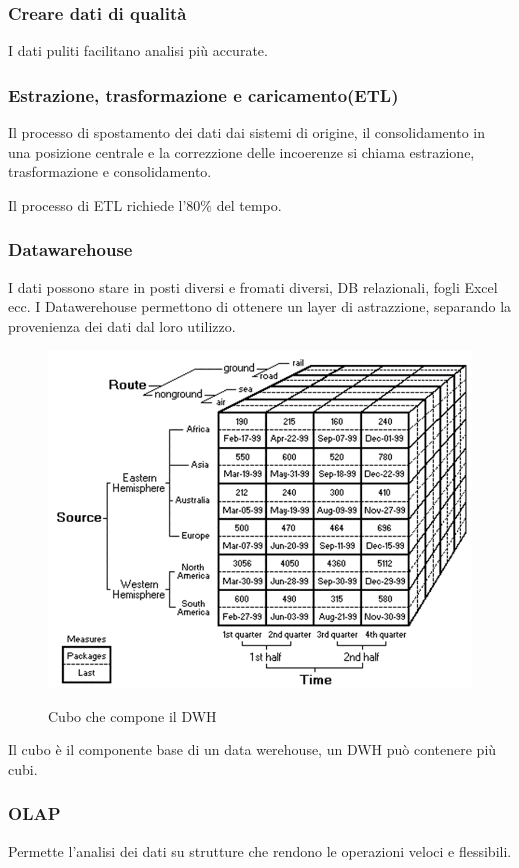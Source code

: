 \subsubsection{Creare dati di qualità}
I dati puliti facilitano analisi più accurate.

\subsubsection{Estrazione, trasformazione e caricamento(ETL)}
Il processo di spostamento dei dati dai sistemi di origine, il consolidamento in una posizione centrale e la
correzzione delle incoerenze si chiama estrazione, trasformazione e consolidamento.

Il processo di ETL richiede l'$80\%$ del tempo.

\subsubsection{Datawarehouse}
I dati possono stare in posti diversi e fromati diversi, DB relazionali, fogli Excel ecc.
I Datawerehouse permettono di ottenere un layer di astrazzione, separando la provenienza dei dati dal loro utilizzo.

\begin{figure}[H]
    \centering
    \includegraphics[width=0.4\linewidth]{imgs/4 - DWH}
    \label{fig:DWH}
    \caption{Cubo che compone il DWH}
\end{figure}

Il cubo è il componente base di un data werehouse, un DWH può contenere più cubi.


\subsubsection{OLAP}
Permette l'analisi dei dati su strutture che rendono le operazioni veloci e flessibili.

